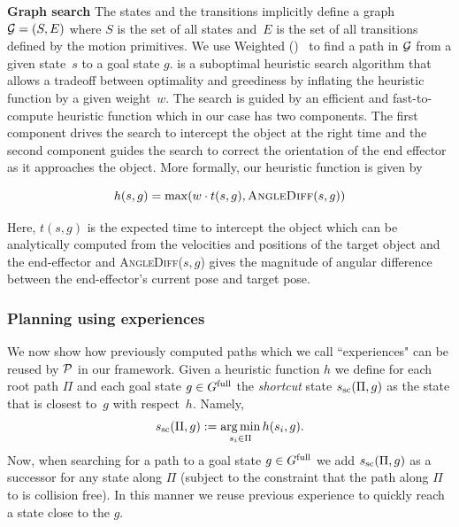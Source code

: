 \documentclass[a4paper]{report}
\begin{document}
\textbf{Graph search}
The states and the transitions implicitly define a graph $\mathcal{G} = (S,E)$ where $S$ is the set of all states and~$E$ is the set of all transitions defined by the motion primitives. We use Weighted \astar (\wastar)~\cite{pohl1970heuristic} to find a path in $\mathcal{G}$ from a given state~$s$ to a goal state $g$. 
\wastar is a suboptimal heuristic search algorithm that allows a tradeoff between optimality and greediness by inflating the heuristic function by a given weight~$w$. 
The search is guided by an efficient and fast-to-compute heuristic function which in our case has two components.
The first component drives the search to intercept the object at the right time and 
the second component guides the search to correct the orientation of the end effector as it approaches the object. 
More formally, our heuristic function is given by

$$
 h(s,g) = \max (w \cdot t(s,g), \textsc{AngleDiff}(s,g))
$$

Here, $t(s,g)$ is the expected time to intercept the object which can be analytically computed from the velocities and positions of the target object and the end-effector and \textsc{AngleDiff}($s,g$) gives the magnitude of angular difference between the end-effector's current pose and target pose.

\subsubsection{Planning using experiences}
We now show how previously computed paths which we call ``experiences" can be reused by $\mathcal{P}$ in our framework. Given a heuristic function $h$ we define for each root path $\Pi$ and each goal state $g \in G^{\textrm{full}}$ the \emph{shortcut} state $s_{\textrm{sc}} (\Pi,g)$ as the  state that is closest to~$g$ with respect~$h$.
Namely,
$$
s_{\textrm{sc}} (\Pi,g) := \operatorname*{arg\,min}\limits_{s_i \in \Pi} h(s_i, g).
$$
Now, when searching for a path to a goal state $g \in G^{\textrm{full}}$ we add $s_{\textrm{sc}} (\Pi,g)$ as a successor for any state along $\Pi$
(subject to the constraint that the path along $\Pi$ to \Ssc is collision free). In this manner we reuse previous experience to quickly reach a state close to the $g$.
\end{document}
